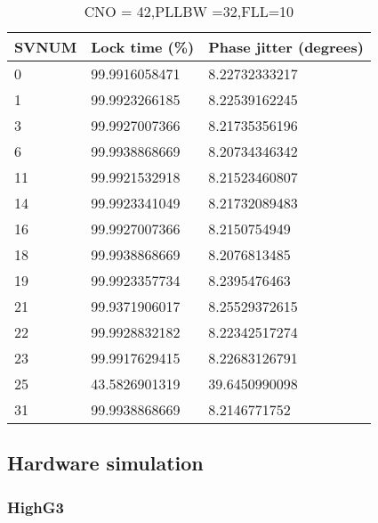 \begin{table}[!htb]
\centering
\begin{tabular}{|l|l|l|}
\hline
\rowcolor[HTML]{C0C0C0} 
SVNUM & Lock time (\%) & Phase jitter (degrees) \\ \hline
0     & 99.9916058471  & 8.22732333217          \\ \hline
\rowcolor[HTML]{EFEFEF} 
1     & 99.9923266185  & 8.22539162245          \\ \hline
3     & 99.9927007366  & 8.21735356196          \\ \hline
\rowcolor[HTML]{EFEFEF} 
6     & 99.9938868669  & 8.20734346342          \\ \hline
11    & 99.9921532918  & 8.21523460807          \\ \hline
\rowcolor[HTML]{EFEFEF} 
14    & 99.9923341049  & 8.21732089483          \\ \hline
16    & 99.9927007366  & 8.2150754949           \\ \hline
\rowcolor[HTML]{EFEFEF} 
18    & 99.9938868669  & 8.2076813485           \\ \hline
19    & 99.9923357734  & 8.2395476463           \\ \hline
\rowcolor[HTML]{EFEFEF} 
21    & 99.9371906017  & 8.25529372615          \\ \hline
22    & 99.9928832182  & 8.22342517274          \\ \hline
\rowcolor[HTML]{EFEFEF} 
23    & 99.9917629415  & 8.22683126791          \\ \hline
25    & 43.5826901319  & 39.6450990098          \\ \hline
\rowcolor[HTML]{EFEFEF} 
31    & 99.9938868669  & 8.2146771752           \\ \hline
\end{tabular}
\caption{CNO = 42,PLLBW =32,FLL=10}
\label{my-label}
\end{table}

\clearpage
\subsection{Hardware simulation}

\subsubsection{HighG3}

